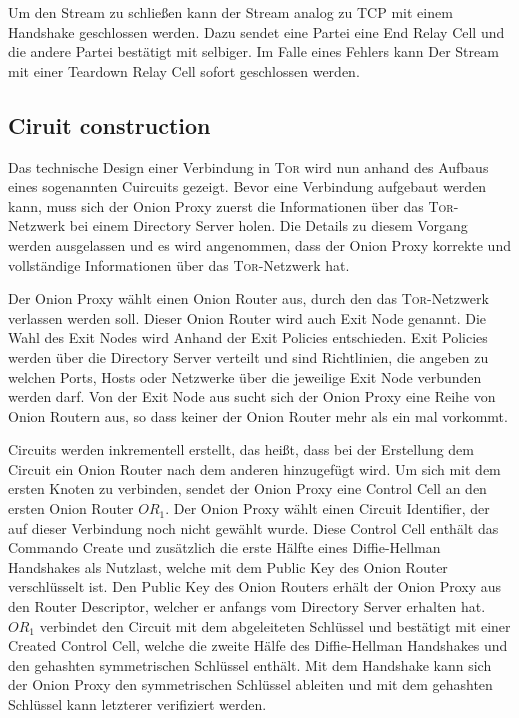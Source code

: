 \documentclass[fleqn,envcountsame,runningheads,10pt,a4paper]{llncs}
\begin{document}
Um den Stream zu schließen kann der Stream analog zu TCP mit einem Handshake geschlossen werden. Dazu sendet eine Partei eine End Relay Cell und die andere Partei bestätigt mit selbiger. Im Falle eines Fehlers kann Der Stream mit einer Teardown Relay Cell sofort geschlossen werden.


\subsection{Ciruit construction}
\label{sec:ciruit_construction}

Das technische Design einer Verbindung in \textsc{Tor} wird nun anhand des Aufbaus eines sogenannten Cuircuits gezeigt. Bevor eine Verbindung aufgebaut werden kann, muss sich der Onion Proxy zuerst die Informationen über das \textsc{Tor}-Netzwerk bei einem Directory Server holen. Die Details zu diesem Vorgang werden ausgelassen und es wird angenommen, dass der Onion Proxy korrekte und vollständige Informationen über das \textsc{Tor}-Netzwerk hat.

Der Onion Proxy wählt einen Onion Router aus, durch den das \textsc{Tor}-Netzwerk verlassen werden soll. Dieser Onion Router wird auch Exit Node genannt. Die Wahl des Exit Nodes wird Anhand der Exit Policies entschieden. Exit Policies werden über die Directory Server verteilt und sind Richtlinien, die angeben zu welchen Ports, Hosts oder Netzwerke über die jeweilige Exit Node verbunden werden darf. Von der Exit Node aus sucht sich der Onion Proxy eine Reihe von Onion Routern aus, so dass keiner der Onion Router mehr als ein mal vorkommt.

Circuits werden inkrementell erstellt, das heißt, dass bei der Erstellung dem Circuit ein Onion Router nach dem anderen hinzugefügt wird. Um sich mit dem ersten Knoten zu verbinden, sendet der Onion Proxy eine Control Cell an den ersten Onion Router $\textit{OR}_1$. Der Onion Proxy wählt einen Circuit Identifier, der auf dieser Verbindung noch nicht gewählt wurde. Diese Control Cell enthält das Commando Create und zusätzlich die erste Hälfte eines Diffie-Hellman Handshakes als Nutzlast, welche mit dem Public Key des Onion Router verschlüsselt ist. Den Public Key des Onion Routers erhält der Onion Proxy aus den Router Descriptor, welcher er anfangs vom Directory Server erhalten hat. $\textit{OR}_1$ verbindet den Circuit mit dem abgeleiteten Schlüssel und  bestätigt mit einer Created Control Cell, welche die zweite Hälfe des Diffie-Hellman Handshakes und den gehashten symmetrischen Schlüssel enthält. Mit dem Handshake kann sich der Onion Proxy den symmetrischen Schlüssel ableiten und mit dem gehashten Schlüssel kann letzterer verifiziert werden.
\end{document}

